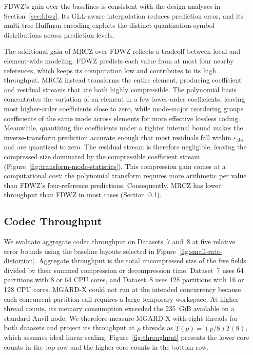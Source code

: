 FDWZ's gain over the baselines is consistent with the design analyses in Section~\ref{sec:fdwz}. Its GLL-aware interpolation reduces prediction error, and its multi-tree Huffman encoding exploits the distinct quantization-symbol distributions across prediction levels.

The additional gain of MRCZ over FDWZ reflects a tradeoff between local and element-wide modeling. FDWZ predicts each value from at most four nearby references, which keeps its computation low and contributes to its high throughput. MRCZ instead transforms the entire element, producing coefficient and residual streams that are both highly compressible. The polynomial basis concentrates the variation of an element in a few lower-order coefficients, leaving most higher-order coefficients close to zero, while mode-major reordering groups coefficients of the same mode across elements for more effective lossless coding. Meanwhile, quantizing the coefficients under a tighter internal bound makes the inverse-transform prediction accurate enough that most residuals fall within $\varepsilon_{\mathrm{abs}}$ and are quantized to zero. The residual stream is therefore negligible, leaving the compressed size dominated by the compressible coefficient stream (Figure~\ref{fig:transform-mode-statistics}). This compression gain comes at a computational cost: the polynomial transform requires more arithmetic per value than FDWZ's four-reference predictions. Consequently, MRCZ has lower throughput than FDWZ in most cases (Section~\ref{sec:parallel-throughput}).

\subsection{Codec Throughput}\label{sec:parallel-throughput}

We evaluate aggregate codec throughput on Datasets~7 and~8 at five relative error bounds using the baseline layouts selected in Figure~\ref{fig:small-rate-distortion}. Aggregate throughput is the total uncompressed size of the five fields divided by their summed compression or decompression time. Dataset~7 uses 64 partitions with 8 or 64 CPU cores, and Dataset~8 uses 128 partitions with 16 or 128 CPU cores. MGARD-X could not run at the intended concurrency because each concurrent partition call requires a large temporary workspace. At higher thread counts, its memory consumption exceeded the 235~GiB available on a standard Anvil node. We therefore measure MGARD-X with eight threads for both datasets and project its throughput at $p$ threads as $\widehat{T}(p)=(p/8)T(8)$, which assumes ideal linear scaling. Figure~\ref{fig:throughput} presents the lower core counts in the top row and the higher core counts in the bottom row.

